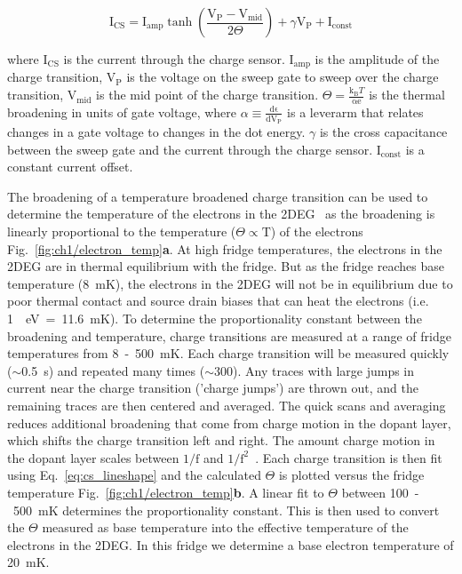 \begin{equation}\label{eq:cs_lineshape}
  \mathrm{I_{CS}} = 
  \mathrm{I_{amp}}
  \tanh
  \left( 
  \frac{\mathrm{V_P - V_{mid}}}{2\Theta}
  \right) + 
  \gamma \mathrm{V_P}
  + \mathrm{I_{const}}
\end{equation}

where $\mathrm{I_{CS}}$ is the current through the charge sensor. $\mathrm{I_{amp}}$ is the amplitude of the charge transition, $\mathrm{V_{P}}$ is the voltage on the sweep gate to sweep over the charge transition, $\mathrm{V_{mid}}$ is the mid point of the charge transition. $\Theta=\frac{\mathrm{k_B}T}{\mathrm{\alpha e}}$ is the thermal broadening in units of gate voltage, where $\alpha \equiv \frac{\mathrm{d\epsilon}}{\mathrm{dV_P}}$ is a leverarm that relates changes in a gate voltage to changes in the dot energy. $\gamma$ is the cross capacitance between the sweep gate and the current through the charge sensor. $\mathrm{I_{const}}$ is a constant current offset.



The broadening of a temperature broadened charge transition can be used to determine the temperature of the electrons in the 2DEG~\cite{cs_measure_temp} as the broadening is linearly proportional to the temperature ($\Theta\propto\mathrm{T}$) of the electrons Fig.~\ref{fig:ch1/electron_temp}\textbf{a}. At high fridge temperatures, the electrons in the 2DEG are in thermal equilibrium with the fridge. But as the fridge reaches base temperature (\qty{8}{mK}), the electrons in the 2DEG will not be in equilibrium due to poor thermal contact and source drain biases that can heat the electrons (i.e. \qty{1}{\mu eV}~=~\qty{11.6}{mK}). 
To determine the proportionality constant between the broadening and temperature, charge transitions are measured at a range of fridge temperatures from \qty{8}{}~-~\qty{500}{mK}. Each charge transition will be measured quickly ($\sim$\qty{0.5}{s}) and repeated many times ($\sim300$). Any traces with large jumps in current near the charge transition ('charge jumps') are thrown out, and the remaining traces are then centered and averaged. The quick scans and averaging reduces additional broadening that come from charge motion in the dopant layer, which shifts the charge transition left and right. The amount charge motion in the dopant layer scales between $\mathrm{1/f}$ and $\mathrm{1/f^2}$~\cite{charge_noise}. Each charge transition is then fit using Eq.~\ref{eq:cs_lineshape} and the calculated $\Theta$ is plotted versus the fridge temperature Fig.~\ref{fig:ch1/electron_temp}\textbf{b}. A linear fit to $\Theta$ between \qty{100}{}~-~\qty{500}{mK} determines the proportionality constant. This is then used to convert the $\Theta$ measured as base temperature into the effective temperature of the electrons in the 2DEG. In this fridge we determine a base electron temperature of \qty{20}{mK}.



